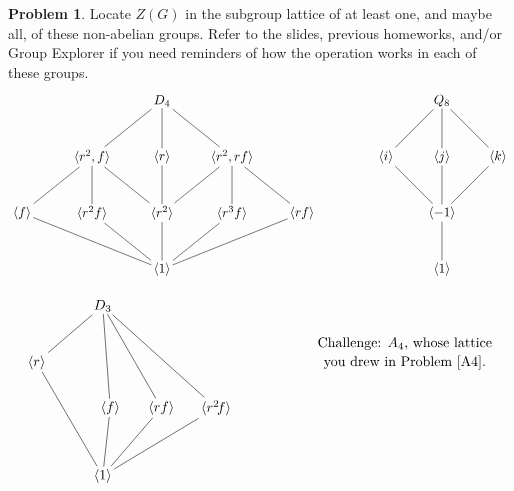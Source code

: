 \documentclass[12pt]{article}
\theoremstyle{definition} %
\newtheorem{problem}{Problem}
\begin{document}
\begin{problem}
    Locate $Z(G)$ in the subgroup lattice of at least one, and maybe all, of these non-abelian groups. Refer to the slides, previous homeworks, and/or Group Explorer if you need reminders of how the operation works in each of these groups.
\[
\begin{tikzpicture}[scale=1.5]
    \begin{scope}[shift={(0,0)},shorten >= -2pt,shorten <= -2pt]
        \node (D4) at (0,4) {$D_4$};
        \node (r2-f) at (-1.25,3) {$\<r^2,f\>$};
        \node (r) at (0,3) {$\<r\>$};
        \node (r2-rf) at (1.25,3) {$\<r^2,rf\>$};
        \node (f) at (-2.5,2) {$\<f\>$};
        \node (r2f) at (-1.25,2) {$\<r^2f\>$};
        \node (r2) at (0,2) {$\<r^2\>$};
        \node (r3f) at (1.25,2) {$\<r^3f\>$};
        \node (rf) at (2.5,2) {$\<rf\>$};
        \node (1) at (0,1) {$\<1\>$};
        \draw (D4) to (r2-f); \draw (D4) to (r); \draw (D4) to (r2-rf);
        \draw (r2-f) to (f); \draw (r2-f) to (r2f); \draw (r2-f) to (r2);
        \draw (r2-rf) to (rf); \draw (r2-rf) to (r3f); \draw (r2-rf) to (r2);
        \draw (r2) to (r);
        \draw (r2) to (1);
        \draw (f) to (1);
        \draw (r2f) to (1); \draw (r3f) to (1); \draw (rf) to (1);
    \end{scope}
    \begin{scope}[shift={(5,1)},shorten >= -2pt,shorten <= -2pt]
        \node(Q8) at (0,3) {$Q_8$};
        \node(i) at (-1,2) { $\<i\>$};
        \node(j) at (0,2) { $\<j\>$};
        \node(k) at (1,2) { $\<k\>$};
        \node(-1) at (0,1) { $\<-1\>$};
        \node(1) at (0,0) { $\left\<1\right\>$};
        \draw(1)--(-1); \draw(-1)--(i); \draw(-1)--(j); \draw(-1)--(k);
        \draw(Q8)--(i); \draw(Q8)--(j); \draw(Q8)--(k);
    \end{scope}
\end{tikzpicture}
\]
\[
\begin{tikzpicture}
    \begin{scope}[shift={(0,0)},shorten >= -2pt, shorten <= -2pt,scale=.95]
        \node(G) at (0,6) {$D_3$};
        \node(r) at (-1.75,4.5) {$\<r\>$};
        \node(e) at (0,1.5) {$\<1\>$};
        \node(f) at (.2,3.3) {$\<f\>$};
        \node(rf) at (1.55,3.3) {$\<rf\>$};
        \node(r2f) at (3,3.3) {$\<r^2\!f\>$};
        \draw(G)--(r); 
        \draw(G)--(f); 
        \draw(G)--(rf); 
        \draw(G)--(r2f); 
        \draw(r)--(e); 
        \draw(f)--(e); 
        \draw(rf)--(e); 
        \draw(r2f)--(e);
        \node at (8,5) {Challenge: $A_4$, whose lattice}; 
        \node at (8,4.5) {you drew in Problem \ref{A4}.};
    \end{scope}
\end{tikzpicture}
\]
\end{problem}
\end{document}
